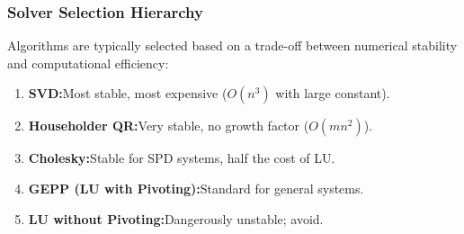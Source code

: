 \documentclass[../readings.tex]{subfiles}
\begin{document}
\subsubsection{Solver Selection Hierarchy}

Algorithms are typically selected based on a trade-off between numerical stability and computational efficiency:
\begin{enumerate}
    \item \textbf{SVD:}\enspace Most stable, most expensive ($O(n^3)$ with large constant).
    \item \textbf{Householder QR:}\enspace Very stable, no growth factor ($O(mn^2)$).
    \item \textbf{Cholesky:}\enspace Stable for SPD systems, half the cost of LU.
    \item \textbf{GEPP (LU with Pivoting):}\enspace Standard for general systems.
    \item \textbf{LU without Pivoting:}\enspace Dangerously unstable; avoid.
\end{enumerate}

\label{def:iterative-refinement}

\end{document}
